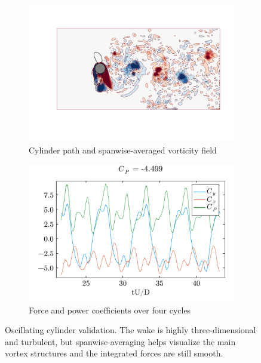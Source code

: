\documentclass[10pt,a4paper]{article}
\begin{document}
\begin{figure}[!t]
    \begin{subfigure}{0.48\linewidth}
      \center
        \includegraphics[width=\linewidth,trim={50 30 20 30},clip]{tex/img/OscCyl_flow.pdf}
        \caption{Cylinder path and spanwise-averaged vorticity field}
    \end{subfigure}
    \begin{subfigure}{0.48\linewidth}
        \centering
        \includegraphics[width=\linewidth]{tex/img/OscCyl_hist.pdf}
        \caption{Force and power coefficients over four cycles}
    \end{subfigure}
  \caption{Oscillating cylinder validation. The wake is highly three-dimensional and turbulent, but spanwise-averaging helps visualize the main vortex structures and the integrated forces are still smooth.}
  \label{fig:cyl_val}
\end{figure}
\end{document}
